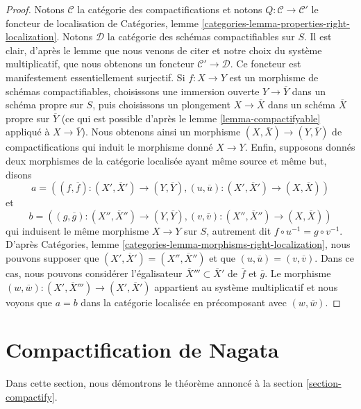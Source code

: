 \begin{proof}
Notons $\mathcal{C}$ la catégorie des compactifications et
notons $Q : \mathcal{C} \to \mathcal{C}'$ le foncteur de
localisation de Catégories, lemme
\ref{categories-lemma-properties-right-localization}.
Notons $\mathcal{D}$ la catégorie des schémas compactifiables
sur $S$. Il est clair, d'après le lemme que nous venons de citer et notre
choix du système multiplicatif, que nous
obtenons un foncteur $\mathcal{C}' \to \mathcal{D}$.
Ce foncteur est manifestement essentiellement surjectif.
Si $f : X \to Y$ est un morphisme de schémas
compactifiables, choisissons une immersion ouverte $Y \to \overline{Y}$
dans un schéma propre sur $S$, puis choisissons un plongement
$X \to \overline{X}$ dans un schéma $\overline{X}$ propre sur
$\overline{Y}$ (ce qui est possible d'après le lemme \ref{lemma-compactifyable}
appliqué à $X \to \overline{Y}$). Nous obtenons ainsi un morphisme
$(X, \overline{X}) \to (Y, \overline{Y})$ de compactifications
qui induit le morphisme donné $X \to Y$.
Enfin, supposons donnés deux morphismes de la
catégorie localisée ayant même source et même but, disons
$$
a = ((f, \overline{f}) : (X', \overline{X}') \to (Y, \overline{Y}),
(u, \overline{u}) : (X', \overline{X}') \to (X, \overline{X}))
$$
et
$$
b = ((g, \overline{g}) : (X'', \overline{X}'') \to (Y, \overline{Y}),
(v, \overline{v}) : (X'', \overline{X}'') \to (X, \overline{X}))
$$
qui induisent le même morphisme $X \to Y$ sur $S$, autrement dit
$f \circ u^{-1} = g \circ v^{-1}$. D'après
Catégories, lemme \ref{categories-lemma-morphisms-right-localization},
nous pouvons supposer que $(X', \overline{X}') = (X'', \overline{X}'')$
et que $(u, \overline{u}) = (v, \overline{v})$. Dans ce cas, nous
pouvons considérer l'égalisateur $\overline{X}''' \subset \overline{X}'$
de $\overline{f}$ et $\overline{g}$. Le morphisme
$(w, \overline{w}) : (X', \overline{X}''') \to (X', \overline{X}')$ appartient
au système multiplicatif et nous voyons que $a = b$ dans la catégorie
localisée en précomposant avec $(w, \overline{w})$.
\end{proof}






\section{Compactification de Nagata}
\label{section-compactifications}

\noindent
Dans cette section, nous démontrons le théorème annoncé à la
section \ref{section-compactify}.

